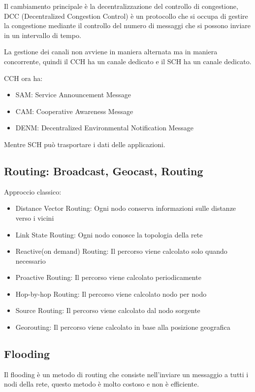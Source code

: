 Il cambiamento principale \`e la decentralizzazione del controllo di congestione,
DCC (Decentralized Congestion Control) \`e un protocollo che si occupa di gestire la congestione
mediante il controllo del numero di messaggi che si possono inviare in un intervallo di tempo.

La gestione dei canali non avviene in maniera alternata ma in maniera concorrente, quindi il CCH
ha un canale dedicato e il SCH ha un canale dedicato.

CCH ora ha:
\begin{itemize}
	\item SAM: Service Announcement Message
	\item CAM: Cooperative Awareness Message
	\item DENM: Decentralized Environmental Notification Message
\end{itemize}

Mentre SCH pu\`o trasportare i dati delle applicazioni.

\subsection{Routing: Broadcast, Geocast, Routing}

Approccio classico:
\begin{itemize}
	\item Distance Vector Routing: Ogni nodo conserva informazioni sulle distanze verso i vicini
	\item Link State Routing: Ogni nodo conosce la topologia della rete
	\item Reactive(on demand) Routing: Il percorso viene calcolato solo quando necessario
	\item Proactive Routing: Il percorso viene calcolato periodicamente
	\item Hop-by-hop Routing: Il percorso viene calcolato nodo per nodo
	\item Source Routing: Il percorso viene calcolato dal nodo sorgente
	\item Georouting: Il percorso viene calcolato in base alla posizione geografica
\end{itemize}




\subsection{Flooding}

Il flooding \`e un metodo di routing che consiste nell'inviare un messaggio a tutti i nodi della
rete, questo metodo \`e molto costoso e non \`e efficiente.

